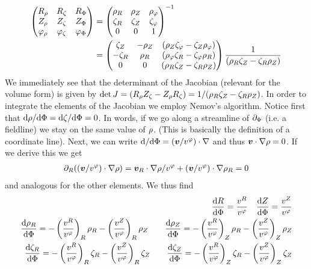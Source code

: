 \begin{align}
\begin{pmatrix}
R_{\rho} & R_{\zeta} & R_{\Phi} \\
Z_{\rho} & Z_{\zeta} & Z_{\Phi} \\
\varphi_{\rho} & \varphi_{\zeta} & \varphi_{\Phi}
\end{pmatrix}
&=
\begin{pmatrix}
{\rho}_R & {\rho}_Z & {\rho}_\varphi \\
{\zeta}_R & {\zeta}_Z & {\zeta}_\varphi \\
0 & 0 & 1
\end{pmatrix}^{-1}
\nonumber\\
&=
\begin{pmatrix}
 {\zeta}_Z & -{\rho}_Z & ({\rho}_Z {\zeta}_\varphi - {\zeta}_Z{\rho}_\varphi) \\
 -{\zeta}_R & {\rho}_R &  ({\rho}_\varphi {\zeta}_R - {\zeta}_\varphi {\rho}_R) \\
0 & 0 & ({\rho}_R {\zeta}_Z - {\zeta}_R {\rho}_Z)
\end{pmatrix}
\frac{1}{({\rho}_R {\zeta}_Z - {\zeta}_R {\rho}_Z)}
\end{align}
We immediately see that the determinant of the Jacobian (relevant for the
volume form) is given by $\det J = (R_{\rho} Z_{\zeta} - Z_{\rho} R_{\zeta}) = 1/({\rho}_R {\zeta}_Z - {\zeta}_R {\rho}_Z)$.
In order to integrate the elements of the Jacobian we employ Nemov's algorithm.
Notice first that $\mathrm{d} {\rho}/ \mathrm{d}{\Phi} = \mathrm{d} {\zeta} / \mathrm{d}{\Phi}  = 0$.
In words, if we go along a streamline of $\partial_{\Phi}$ (i.e. a fieldline) we
stay on the same value of ${\rho}$. (This is basically the definition of a coordinate line).
Next, we can write $\mathrm{d} / \mathrm{d}{\Phi} = ({\boldsymbol{v}}/v^\varphi) \cdot \nabla $ and thus
${\boldsymbol{v}} \cdot \nabla {\rho} = 0$. If we derive this we get
\begin{align}
\partial_R ( ({\boldsymbol{v}}/v^\varphi)\cdot\nabla {\rho} ) = {\boldsymbol{v}}_R \cdot \nabla{\rho}/v^\varphi + ({\boldsymbol{v}}/v^\varphi)\cdot \nabla {\rho}_R = 0
\end{align}
and analogous for the other elements. We thus find
\begin{align}
\frac{\mathrm{d} R}{\mathrm{d}{\Phi}} = \frac{v^R}{ v^\varphi} \quad
\frac{\mathrm{d} Z}{\mathrm{d}{\Phi}} = \frac{v^Z}{ v^\varphi} \\
\frac{\mathrm{d} {\rho}_R}{\mathrm{d}{\Phi}} =
- \left(\frac{v^R}{ v^\varphi}\right)_R {\rho}_R
- \left(\frac{v^Z}{ v^\varphi}\right)_R {\rho}_Z
\qquad
\frac{\mathrm{d} {\rho}_Z}{\mathrm{d}{\Phi}} =
- \left(\frac{v^R}{ v^\varphi}\right)_Z {\rho}_R
- \left(\frac{v^Z}{ v^\varphi}\right)_Z {\rho}_Z
\\
\frac{\mathrm{d} {\zeta}_R}{\mathrm{d}{\Phi}} =
- \left(\frac{v^R}{ v^\varphi}\right)_R {\zeta}_R
- \left(\frac{v^Z}{ v^\varphi}\right)_R {\zeta}_Z
\qquad
\frac{\mathrm{d} {\zeta}_Z}{\mathrm{d}{\Phi}} =
- \left(\frac{v^R}{ v^\varphi}\right)_Z {\zeta}_R
- \left(\frac{v^Z}{ v^\varphi}\right)_Z {\zeta}_Z
\end{align}
